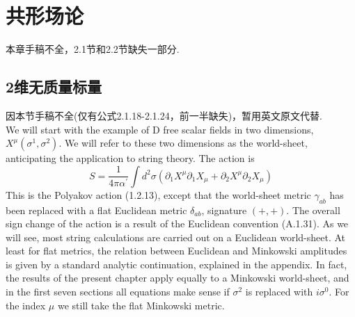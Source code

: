 \setcounter{section}{0}%
\setcounter{chapter}{1}

\chapter{共形场论}
本章手稿不全，2.1节和2.2节缺失一部分.

\section{2维无质量标量}
因本节手稿不全(仅有公式2.1.18-2.1.24，前一半缺失)，暂用英文原文代替.\\
We will start with the example of D free scalar fields in two dimensions,$X^{\mu}\left(\sigma^{1}, \sigma^{2}\right)$.
We will refer to these two dimensions as the world-sheet,
anticipating the application to string theory. The action is
\begin{equation}
S=\frac{1}{4 \pi \alpha^{\prime}} \int d^{2} \sigma\left(\partial_{1} X^{\mu} \partial_{1} X_{\mu}+\partial_{2} X^{\mu} \partial_{2} X_{\mu}\right)
\end{equation}
This is the Polyakov action (1.2.13), except that the world-sheet metric $\gamma_{a b}$ has been replaced with a flat Euclidean metric $\delta_{a b}$, signature $(+,+) .$ The overall sign change of the action is a result of the Euclidean convention (A.1.31). As we will see, most string calculations are carried out on a Euclidean world-sheet. At least for flat metrics, the relation between Euclidean and Minkowski amplitudes is given by a standard analytic continuation, explained in the appendix. In fact, the results of the present chapter apply equally to a Minkowski world-sheet, and in the first seven sections all equations make sense if $\sigma^{2}$ is replaced with $i \sigma^{0} .$ For the index $\mu$ we still take the flat Minkowski metric.\\

